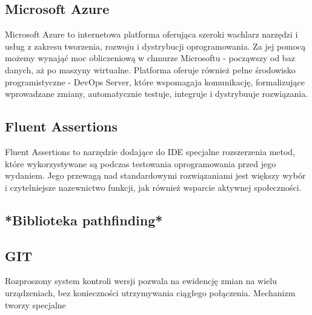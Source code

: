 \subsection{Microsoft Azure}
Microsoft Azure \cite{azure} to internetowa platforma oferująca szeroki wachlarz narzędzi i usług
z zakresu tworzenia, rozwoju i dystrybucji oprogramowania. Za jej pomocą możemy wynająć moc obliczeniową
w chmurze Microsoftu - począwszy od baz danych, aż po maszyny wirtualne. Platforma oferuje również
pełne środowisko programistyczne - DevOps Server, które wspomagaja komunikację, 
formalizujące wprowadzane zmiany, automatycznie testuje, integruje i dystrybuuje rozwiązania.

\subsection{Fluent Assertions}
Fluent Assertions \cite{fluentassertions} to narzędzie dodające do IDE specjalne rozszerzenia
metod, które wykorzystywane są podczas testowania oprogramowania przed jego wydaniem.
Jego przewagą nad standardowymi rozwiązaniami jest większy wybór i czytelniejsze
nazewnictwo funkcji, jak również wsparcie aktywnej społeczności.


\subsection{*Biblioteka pathfinding*}

\subsection{GIT}
Rozproszony system kontroli wersji pozwala na ewidencję zmian na wielu urządzeniach,
bez konieczności utrzymywania ciągłego połączenia. Mechanizm tworzy specjalne 
